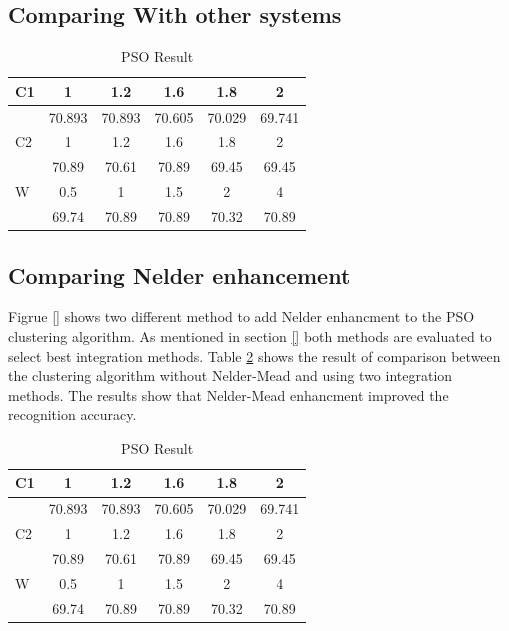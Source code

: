 \documentclass[a4paper,twoside]{article}
\begin{document}
\subsection {Comparing With other systems}
\label{sec:comparingSystems}



\begin{table}
	\centering
		\caption{PSO Result }
	\label{tab:system}
		\begin{tabular}{|l|c|c|c|c|c|}
		 \hline
C1 &	1	&1.2&	1.6&	1.8 &	2	\\ \hline
	&70.893	&70.893	&70.605	&70.029	&69.741 \\  \hline
C2	&	1	&1.2&	1.6&	1.8 &	2	\\ \hline
	&70.89	&70.61	&70.89	&69.45	&69.45 \\ \hline
W	&0.5&	1	&1.5	&2&	4	\\ \hline
	&69.74	&70.89&	70.89	&70.32&	70.89	\\ \hline
\end{tabular}
\end{table}

\subsection{ Comparing Nelder enhancement}
\label{sec:comparingSystems}
Figrue \ref{} shows two different method to add Nelder enhancment to the PSO clustering algorithm. As mentioned in section \ref{} both methods are evaluated to select best integration methods.  Table \ref{tab:nelder} shows the result of comparison between the clustering algorithm without Nelder-Mead and using two integration methods. The results show that Nelder-Mead enhancment improved the recognition accuracy. %

\begin{table}
	\centering
		\caption{PSO Result }
	\label{tab:nelder}
		\begin{tabular}{|l|c|c|c|c|c|}
		 \hline
C1 &	1	&1.2&	1.6&	1.8 &	2	\\ \hline
	&70.893	&70.893	&70.605	&70.029	&69.741 \\  \hline
C2	&	1	&1.2&	1.6&	1.8 &	2	\\ \hline
	&70.89	&70.61	&70.89	&69.45	&69.45 \\ \hline
W	&0.5&	1	&1.5	&2&	4	\\ \hline
	&69.74	&70.89&	70.89	&70.32&	70.89	\\ \hline
\end{tabular}
\end{table}
\end{document}
